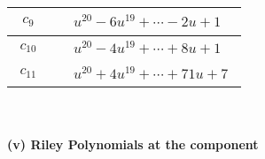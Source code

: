 \documentclass[1p]{elsarticle_modified}
\theoremstyle{definition}
\begin{document}
\begin{tabular}{m{50pt}|m{274pt}}
\hline $$\begin{aligned}c_{9}\end{aligned}$$&$\begin{aligned}
&u^{20}-6 u^{19}+\cdots-2 u+1
\end{aligned}$\\
\hline $$\begin{aligned}c_{10}\end{aligned}$$&$\begin{aligned}
&u^{20}-4 u^{19}+\cdots+8 u+1
\end{aligned}$\\
\hline $$\begin{aligned}c_{11}\end{aligned}$$&$\begin{aligned}
&u^{20}+4 u^{19}+\cdots+71 u+7
\end{aligned}$\\
\hline
\end{tabular}\\~\\
\newpage\renewcommand{\arraystretch}{1}
\flushleft \textbf{(v) Riley Polynomials at the component}\newline \\
\end{document}
